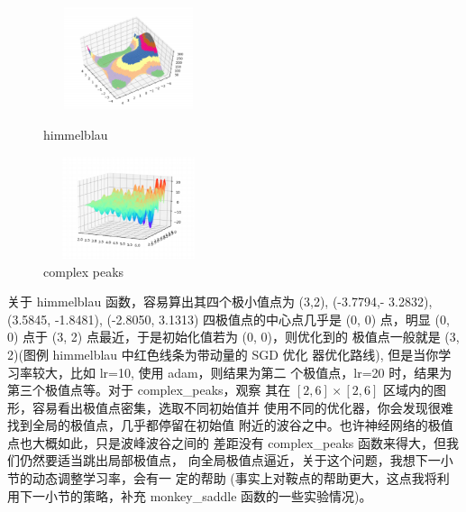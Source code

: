 \documentclass[UTF8]{ctexart}
\begin{document}
\begin{figure}[htbp]
	\centering
	\begin{minipage}[t]{0.48\textwidth}
	\centering
	\includegraphics[width=5cm, height=3cm]{./pic/himmelblau.png}
	\caption{himmelblau}
	\end{minipage}
	\begin{minipage}[t]{0.48\textwidth}
	\centering
	\includegraphics[width=5cm,height=3cm]{./pic/complex_peaks.png}
	\caption{complex peaks}
	\label{complex_peaks}
	\end{minipage}
\end{figure}


关于 himmelblau 函数，容易算出其四个极小值点为 (3,2), (-3.7794,-
3.2832), (3.5845, -1.8481), (-2.8050, 3.1313) 四极值点的中心点几乎是 (0, 0)
点，明显 (0, 0) 点于 (3, 2) 点最近，于是初始化值若为 (0, 0)，则优化到的
极值点一般就是 (3, 2)(图例 himmelblau 中红色线条为带动量的 SGD 优化
器优化路线), 但是当你学习率较大，比如 lr=10, 使用 adam，则结果为第二
个极值点，lr=20 时，结果为第三个极值点等。对于 complex\_peaks，观察
其在 $[2, 6] \times [2, 6]$ 区域内的图形，容易看出极值点密集，选取不同初始值并
使用不同的优化器，你会发现很难找到全局的极值点，几乎都停留在初始值
附近的波谷之中。也许神经网络的极值点也大概如此，只是波峰波谷之间的
差距没有 complex\_peaks 函数来得大，但我们仍然要适当跳出局部极值点，
向全局极值点逼近，关于这个问题，我想下一小节的动态调整学习率，会有一
定的帮助 (事实上对鞍点的帮助更大，这点我将利用下一小节的策略，补充
monkey\_saddle 函数的一些实验情况)。
\end{document}
